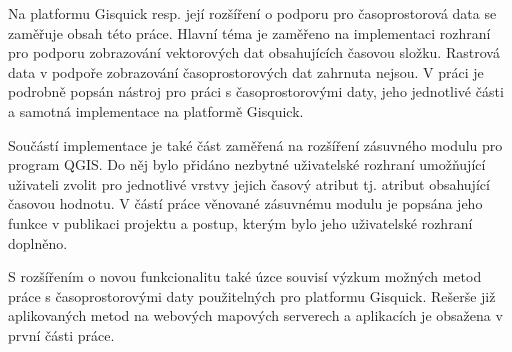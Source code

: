 \bigskip
Na platformu Gisquick resp. její rozšíření o podporu pro
časoprostorová data se zaměřuje obsah této práce. Hlavní téma je
zaměřeno na implementaci rozhraní pro podporu zobrazování vektorových
dat obsahujících časovou složku. Rastrová data v podpoře zobrazování časoprostorových dat zahrnuta nejsou. V práci je podrobně popsán nástroj
pro práci s časoprostorovými daty, jeho jednotlivé části a samotná
implementace na platformě Gisquick.

Součástí implementace je také část zaměřená na rozšíření zásuvného
modulu pro program QGIS. Do něj bylo přidáno nezbytné uživatelské
rozhraní umožňující uživateli zvolit pro jednotlivé vrstvy jejich
časový atribut tj. atribut obsahující časovou hodnotu. V částí práce věnované zásuvnému modulu je popsána jeho funkce v publikaci
projektu a postup, kterým bylo jeho uživatelské rozhraní doplněno.

S rozšířením o novou funkcionalitu také úzce souvisí výzkum možných metod práce s
časoprostorovými daty použitelných pro platformu Gisquick. Rešerše již
aplikovaných metod na webových mapových serverech a aplikacích je
obsažena v první části práce.